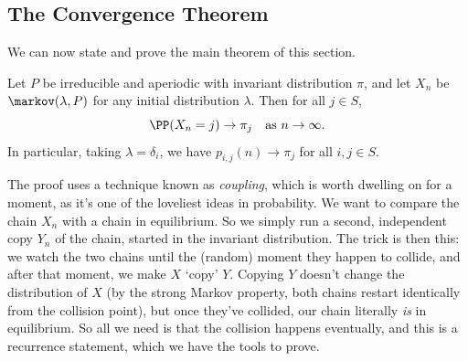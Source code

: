 \documentclass[a4paper]{scrartcl}
\begin{document}
\subsection{The Convergence Theorem}

We can now state and prove the main theorem of this section.

\begin{theorem}
	Let $P$ be irreducible and aperiodic with invariant distribution $\pi$, and let $X_n$ be $\markov(\lambda, P)$ for any initial distribution $\lambda$. Then for all $j \in S$,
	$$
	\PP(X_n = j) \rightarrow \pi_j \quad \text{as } n \rightarrow \infty.
	$$
	In particular, taking $\lambda = \delta_i$, we have $p_{i, j}(n) \rightarrow \pi_j$ for all $i, j \in S$.
\end{theorem}

The proof uses a technique known as \emph{coupling}, which is worth dwelling on for a moment, as it's one of the loveliest ideas in probability. We want to compare the chain $X_n$ with a chain in equilibrium. So we simply run a second, independent copy $Y_n$ of the chain, started in the invariant distribution. The trick is then this: we watch the two chains until the (random) moment they happen to collide, and after that moment, we make $X$ `copy' $Y$. Copying $Y$ doesn't change the distribution of $X$ (by the strong Markov property, both chains restart identically from the collision point), but once they've collided, our chain literally \emph{is} in equilibrium. So all we need is that the collision happens eventually, and this is a recurrence statement, which we have the tools to prove.
\end{document}
